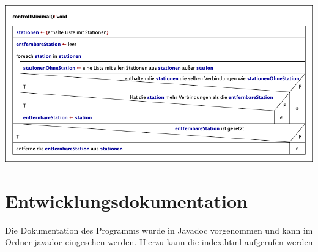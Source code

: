 \begin{center}
    \includegraphics[width=\linewidth]{images/Struktogramme/algorithm/controllMinimal.png}
    \label{pro:subsubsecpar:ueberpruefe-minimale-anzahl-an-servicestationen}
\end{center}

\section{Entwicklungsdokumentation}\label{pro:sec:entwicklerdokumentation}
Die Dokumentation des Programms wurde in Javadoc vorgenommen und kann im Ordner javadoc eingesehen werden.
Hierzu kann die index.html aufgerufen werden